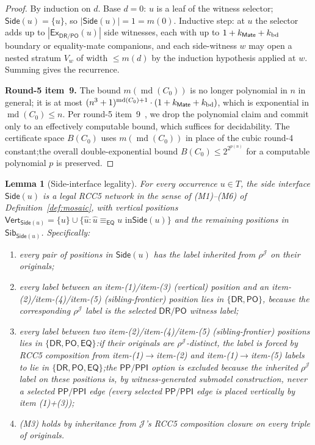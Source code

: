 \documentclass[11pt]{article}
\newtheorem{lemma}[theorem]{Lemma}
\newcommand{\EQ}{\mathsf{EQ}}
\newcommand{\DR}{\mathsf{DR}}
\newcommand{\PO}{\mathsf{PO}}
\newcommand{\PP}{\mathsf{PP}}
\newcommand{\PPI}{\mathsf{PPI}}
\newcommand{\Ex}{\mathsf{Ex}}
\newcommand{\J}{\mathcal J}
\newcommand{\Mate}{\mathsf{Mate}}
\newcommand{\eqc}{\equiv_{\EQ}}
\newcommand{\Vrt}{\mathsf{Vert}}
\newcommand{\Sib}{\mathsf{Sib}}
\newcommand{\Side}{\mathsf{Side}}
\newcommand{\md}{\operatorname{md}}
\begin{document}
\begin{proof}
By induction on $d$.  Base $d=0$: $u$ is a leaf of the witness
selector;\@ $\Side(u)=\{u\}$, so $|\Side(u)|=1=m(0)$.  Inductive
step: at $u$ the selector adds up to $|\Ex_{\DR/\PO}(u)|$ side
witnesses, each with up to $1+k_{\Mate}+k_{\rm bd}$ boundary or
equality-mate companions, and each side-witness $w$ may open a
nested stratum $V_w$ of width $\le m(d)$ by the induction
hypothesis applied at $w$.  Summing gives the recurrence.

\textbf{Round-5 item~9.}  The bound $m(\md(C_0))$ is no longer
polynomial in $n$ in general; it is at most $(n^3+1)^{\md(C_0)+1}
\cdot(1+k_{\Mate}+k_{\rm bd})$, which is exponential in
$\md(C_0)\le n$.  Per round-5 item~9~\cite{GPT55Round5Review}, we
drop the polynomial claim and commit only to an effectively
computable bound, which suffices for decidability.  The certificate
space $B(C_0)$ uses $m(\md(C_0))$ in place of the cubic round-4
constant;\@ the overall double-exponential bound $B(C_0)\le
2^{2^{p(n)}}$ for a computable polynomial $p$ is preserved.
\end{proof}

\begin{lemma}[Side-interface legality]\label{lem:side-placement}
For every occurrence $u\in T$, the side interface $\Side(u)$ is a
legal RCC5 network in the sense of (M1)--(M6) of
Definition~\ref{def:mosaic}, with vertical positions
$\Vrt_{\Side(u)}=\{u\}\cup\{\widehat u : \widehat u\eqc u\text{ in
}\Side(u)\}$ and the remaining positions in $\Sib_{\Side(u)}$.
Specifically:
\begin{enumerate}[label=(\alph*)]
\item every pair of positions in $\Side(u)$ has the label
inherited from $\rho^\J$ on their originals;
\item every label between an item-(1)/item-(3) (vertical) position
and an item-(2)/item-(4)/item-(5) (sibling-frontier) position lies
in $\{\DR,\PO\}$, because the corresponding $\rho^\J$ label is the
selected $\DR/\PO$ witness label;
\item every label between two item-(2)/item-(4)/item-(5)
(sibling-frontier) positions lies in $\{\DR,\PO,\EQ\}$:\@ if their
originals are $\rho^\J$-distinct, the label is forced by RCC5
composition from item-(1)$\to$item-(2) and item-(1)$\to$item-(5)
labels to lie in $\{\DR,\PO,\EQ\}$;\@ the $\PP/\PPI$ option is
excluded because the inherited $\rho^\J$ label on these positions
is, by witness-generated submodel construction, never a selected
$\PP/\PPI$ edge (every selected $\PP/\PPI$ edge is placed
vertically by item (1)+(3));
\item (M3) holds by inheritance from $\J$'s RCC5 composition
closure on every triple of originals.
\end{enumerate}
\end{lemma}
\end{document}
